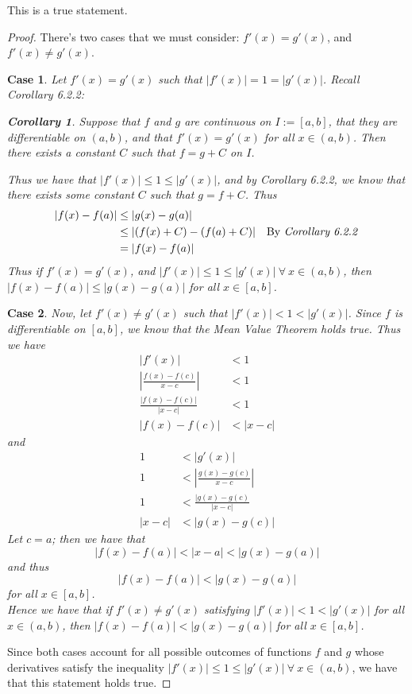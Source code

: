 \documentclass[12pt,letterpaper]{article}
\newcommand{\abs}[1]{\left\lvert #1 \right\rvert}
\theoremstyle{case}
\newtheorem{case}{Case}
\theoremstyle{definition}
\newtheorem*{corollary*}{Corollary}
\begin{document}
\begin{enumerate}
\begin{enumerate}
			This is a true statement.
			\begin{proof}
				There's two cases that we must consider: $f'(x)=g'(x)$, and $f'(x)\neq g'(x)$. \\
				\begin{case}
					Let $f'(x)=g'(x)$ such that $|f'(x)|=1=|g'(x)|$. Recall \textit{Corollary 6.2.2}:
					\begin{corollary*}
						Suppose that $f$ and $g$ are continuous on $I:=[a,b]$, that they are differentiable on $(a,b)$, and that $f'(x)=g'(x)$ for all $x \in (a,b)$. Then there exists a constant $C$ such that $f=g+C$ on $I$.
					\end{corollary*}
					Thus we have that $|f'(x)| \leq 1 \leq |g'(x)|$, and by \textit{Corollary 6.2.2}, we know that there exists some constant $C$ such that $g=f+C$. Thus
					\begin{align*}
						|f(x)-f(a)| &\leq |g(x)-g(a)| \\
						&\leq |(f(x)+C)-(f(a)+C)| &\text{By \textit{Corollary 6.2.2}} \\
						&=|f(x)-f(a)|
					\end{align*}
					Thus if $f'(x)=g'(x)$, and $|f'(x)| \leq 1 \leq |g'(x)|\ \forall\ x \in (a,b)$, then $|f(x)-f(a)| \leq |g(x)-g(a)|$ for all $x \in [a,b]$.
				\end{case}
				\begin{case}
					Now, let $f'(x) \neq g'(x)$ such that $|f'(x)| < 1 < |g'(x)|$. Since $f$ is differentiable on $[a,b]$, we know that the \textit{Mean Value Theorem} holds true. Thus we have
					\begin{align*}
						|f'(x)|&<1 \\
						\abs{\frac{f(x)-f(c)}{x-c}} &<1 \\
						\frac{|f(x)-f(c)|}{|x-c|} &< 1 \\
						|f(x)-f(c)|&<|x-c|
					\end{align*}
					and
					\begin{align*}
						1 &< |g'(x)| \\
						1 &< \abs{\frac{g(x)-g(c)}{x-c}} \\
						1 &< \frac{|g(x)-g(c)}{|x-c|} \\
						|x-c| &< |g(x)-g(c)|
					\end{align*}
					Let $c=a$; then we have that
					\[|f(x)-f(a)|<|x-a|<|g(x)-g(a)|\]
					and thus
					\[|f(x)-f(a)|<|g(x)-g(a)|\]
					for all $x \in [a,b]$.\\
					
					Hence we have that if $f'(x) \neq g'(x)$ satisfying $|f'(x)|<1<|g'(x)|$ for all $x \in (a,b)$, then $|f(x)-f(a)|<|g(x)-g(a)|$ for all $x \in [a,b]$.
				\end{case}
				Since both cases account for all possible outcomes of functions $f$ and $g$ whose derivatives satisfy the inequality $|f'(x)|\leq 1 \leq |g'(x)|\ \forall\ x \in (a,b)$, we have that this statement holds true.
			\end{proof}
			

\end{enumerate}
\end{enumerate}
\end{document}
